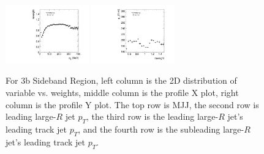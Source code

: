 \begin{figure}[htbp!]
\begin{center}
\includegraphics[angle=270, width=0.32\textwidth]{./figures/boosted/AppendixReweight/Weights/3Trk_Sideband_sublHCand_trk0_Pt_weight_profx.pdf}
\includegraphics[angle=270, width=0.32\textwidth]{./figures/boosted/AppendixReweight/Weights/3Trk_Sideband_sublHCand_trk0_Pt_weight_profy.pdf}\\
\caption{For 3b Sideband Region, left column is the 2D distribution of variable vs. weights, middle column is the profile X plot, right column is the profile Y plot. The top row is MJJ, the second row is leading large-$R$ jet $p_{T}$, the third row is the leading large-$R$ jet's leading track jet $p_{T}$, and the fourth row is the subleading large-$R$ jet's leading track jet $p_{T}$.}
\label{fig:app-reweight-dist-3b-SB}
\end{center}
\end{figure}


